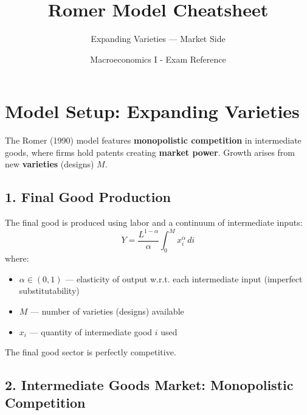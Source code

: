 \documentclass[a4paper,11pt]{article}
\title{\textbf{Romer Model Cheatsheet}}
\subtitle{Expanding Varieties --- Market Side}
\author{Macroeconomics I - Exam Reference}
\date{}
\begin{document}
\maketitle

\section{Model Setup: Expanding Varieties}

The Romer (1990) model features \textbf{monopolistic competition} in intermediate goods, where firms hold patents creating \textbf{market power}. Growth arises from new \textbf{varieties} (designs) $M$.

\subsection*{1. Final Good Production}

\bigskip
\begin{tcolorbox}[colback=blue!5,colframe=blue3,title=Final Good Technology]
The final good is produced using labor and a continuum of intermediate inputs:
\[
Y = \frac{L^{1-\alpha}}{\alpha} \int_{0}^{M} x_i^\alpha \, di
\tag{Final-Good Production}
\]
where:
\begin{itemize}
    \item $\alpha \in (0,1)$ --- elasticity of output w.r.t. each intermediate input (imperfect substitutability)
    \item $M$ --- number of varieties (designs) available
    \item $x_i$ --- quantity of intermediate good $i$ used
\end{itemize}
\end{tcolorbox}

The final good sector is perfectly competitive.

\subsection*{2. Intermediate Goods Market: Monopolistic Competition}
\end{document}

